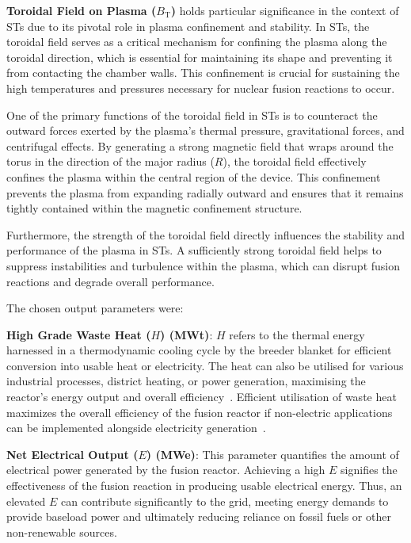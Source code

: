 \documentclass[journal]{IEEEtran}
\begin{document}
\textbf{Toroidal Field on Plasma ($B_{\text{T}}$)} holds particular significance in the context of STs due to its pivotal role in plasma confinement and stability. In STs, the toroidal field serves as a critical mechanism for confining the plasma along the toroidal direction, which is essential for maintaining its shape and preventing it from contacting the chamber walls. This confinement is crucial for sustaining the high temperatures and pressures necessary for nuclear fusion reactions to occur.

One of the primary functions of the toroidal field in STs is to counteract the outward forces exerted by the plasma's thermal pressure, gravitational forces, and centrifugal effects. By generating a strong magnetic field that wraps around the torus in the direction of the major radius ($R$), the toroidal field effectively confines the plasma within the central region of the device. This confinement prevents the plasma from expanding radially outward and ensures that it remains tightly contained within the magnetic confinement structure.

Furthermore, the strength of the toroidal field directly influences the stability and performance of the plasma in STs. A sufficiently strong toroidal field helps to suppress instabilities and turbulence within the plasma, which can disrupt fusion reactions and degrade overall performance.

The chosen output parameters were:

\textbf{High Grade Waste Heat ($H$) (MWt)}: $H$ refers to the thermal energy harnessed in a thermodynamic cooling cycle by the breeder blanket for efficient conversion into usable heat or electricity. The heat can also be utilised for various industrial processes, district heating, or power generation, maximising the reactor's energy output and overall efficiency~\cite{Griffiths2022}. Efficient utilisation of waste heat maximizes the overall efficiency of the fusion reactor if non-electric applications can be implemented alongside electricity generation~\cite{Hidalgo-Salaverri2023}.

\textbf{Net Electrical Output ($E$) (MWe)}: This parameter quantifies the amount of electrical power generated by the fusion reactor. Achieving a high $E$ signifies the effectiveness of the fusion reaction in producing usable electrical energy. Thus, an elevated $E$ can contribute significantly to the grid, meeting energy demands to provide baseload power and ultimately reducing reliance on fossil fuels or other non-renewable sources. 
\end{document}

